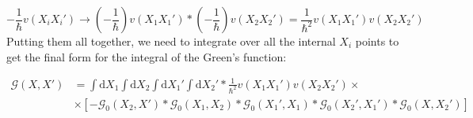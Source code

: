 \begin{equation} \label{eq:33}
- \frac{1}{\hbar} v \left( X_{i} X_{i}' \right)
\to
\left( - \frac{1}{\hbar} \right) v \left( X_{1} X_{1}' \right)
*
\left( - \frac{1}{\hbar} \right) v \left( X_{2} X_{2}' \right)
=
\frac{1}{\hbar^{2}} v \left( X_{1} X_{1}' \right) v \left( X_{2} X_{2}' \right)
\end{equation}
Putting them all together, we need to integrate over all the internal $X_{i}$ points to get the final form for the integral of the Green's function:

\begin{align} \label{eq:34}
\mathcal{G} \left( X, X' \right)
&=
\int \text{d}X_{1} \int \text{d}X_{2} \int \text{d}X_{1}' \int \text{d}X_{2}'
*
\frac{1}{\hbar^{2}} v \left( X_{1} X_{1}' \right) v \left( X_{2} X_{2}' \right)
\times \nonumber \\
&\times
\left[
- \mathcal{G}_{0} \left( X_{2}, X' \right)
*
\mathcal{G}_{0} \left( X_{1}, X_{2} \right)
*
\mathcal{G}_{0} \left( X_{1}', X_{1} \right)
*
\mathcal{G}_{0} \left( X_{2}', X_{1}' \right)
*
\mathcal{G}_{0} \left( X, X_{2}' \right)
\right]
\end{align}